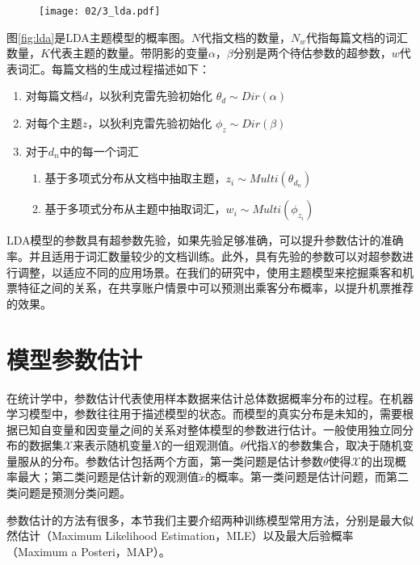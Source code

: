 \begin{figure}[!h]
 \centering
 \texttt{[image: 02/3\_lda.pdf]}
\end{figure}

图\ref{fig:lda}是LDA主题模型的概率图。$N$代指文档的数量，$N_w$代指每篇文档的词汇数量，$K$代表主题的数量。带阴影的变量$\alpha$，$\beta$分别是两个待估参数的超参数，$w$代表词汇。每篇文档的生成过程描述如下：

\begin{enumerate}
\item 对每篇文档$d$，以狄利克雷先验初始化 $\theta_d \sim Dir(\alpha)$
\item 对每个主题$z$，以狄利克雷先验初始化 $\phi_z \sim Dir(\beta)$
\item 对于$d_n$中的每一个词汇
       \begin{enumerate}[fullwidth,itemindent=1em,label=(\alph*)]
       \item 基于多项式分布从文档中抽取主题，$z_i \sim Multi(\theta_{d_n})$
       \item 基于多项式分布从主题中抽取词汇，$w_i \sim Multi(\phi_{z_i})$
       \end{enumerate}
\end{enumerate}

LDA模型的参数具有超参数先验，如果先验足够准确，可以提升参数估计的准确率。并且适用于词汇数量较少的文档训练。此外，具有先验的参数可以对超参数进行调整，以适应不同的应用场景。在我们的研究中，使用主题模型来挖掘乘客和机票特征之间的关系，在共享账户情景中可以预测出乘客分布概率，以提升机票推荐的效果。


\iffalse
\section{模型参数估计}

在统计学中，参数估计\cite{heinrich2008parameter}代表使用样本数据来估计总体数据概率分布的过程。在机器学习模型中，参数往往用于描述模型的状态。而模型的真实分布是未知的，需要根据已知自变量和因变量之间的关系对整体模型的参数进行估计。一般使用独立同分布的数据集$\mathcal{X}$来表示随机变量$X$的一组观测值。$\theta$代指$X$的参数集合，取决于随机变量服从的分布。参数估计包括两个方面，第一类问题是估计参数$\theta$使得$\mathcal{X}$的出现概率最大；第二类问题是估计新的观测值$\tilde{x}$的概率。第一类问题是估计问题，而第二类问题是预测分类问题。

参数估计的方法有很多，本节我们主要介绍两种训练模型常用方法，分别是最大似然估计（Maximum Likelihood Estimation，MLE）\cite{johansen1990maximum}以及最大后验概率（Maximum a Posteri，MAP）\cite{gauvain1994maximum}。

